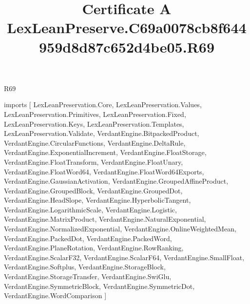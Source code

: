 \begin{lexlean}{R69}
\title{Certificate A LexLeanPreserve.C69a0078cb8f644959d8d87c652d4be05.R69}
\begin{coremodule}
imports [
  LexLeanPreservation.Core,
  LexLeanPreservation.Values,
  LexLeanPreservation.Primitives,
  LexLeanPreservation.Fixed,
  LexLeanPreservation.Keys,
  LexLeanPreservation.Templates,
  LexLeanPreservation.Validate,
  VerdantEngine.BitpackedProduct,
  VerdantEngine.CircularFunctions,
  VerdantEngine.DeltaRule,
  VerdantEngine.ExponentialIncrement,
  VerdantEngine.FloatStorage,
  VerdantEngine.FloatTransform,
  VerdantEngine.FloatUnary,
  VerdantEngine.FloatWord64,
  VerdantEngine.FloatWord64Exports,
  VerdantEngine.GaussianActivation,
  VerdantEngine.GroupedAffineProduct,
  VerdantEngine.GroupedBlock,
  VerdantEngine.GroupedDot,
  VerdantEngine.HeadSlope,
  VerdantEngine.HyperbolicTangent,
  VerdantEngine.LogarithmicScale,
  VerdantEngine.Logistic,
  VerdantEngine.MatrixProduct,
  VerdantEngine.NaturalExponential,
  VerdantEngine.NormalizedExponential,
  VerdantEngine.OnlineWeightedMean,
  VerdantEngine.PackedDot,
  VerdantEngine.PackedWord,
  VerdantEngine.PlaneRotation,
  VerdantEngine.RowRanking,
  VerdantEngine.ScalarF32,
  VerdantEngine.ScalarF64,
  VerdantEngine.SmallFloat,
  VerdantEngine.Softplus,
  VerdantEngine.StorageBlock,
  VerdantEngine.StorageTransfer,
  VerdantEngine.SwiGlu,
  VerdantEngine.SymmetricBlock,
  VerdantEngine.SymmetricDot,
  VerdantEngine.WordComparison
]


\end{coremodule}
\end{lexlean}
